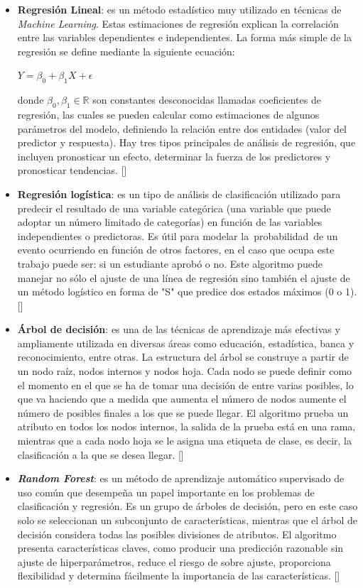 \begin{itemize}
    \item \textbf{Regresión Lineal}: es un método estadístico muy utilizado en técnicas de \textit{Machine Learning}. Estas estimaciones de regresión explican la correlación entre las variables dependientes e independientes. La forma más simple de la regresión se define mediante la siguiente ecuación:
    \begin{center}
        $Y = \beta_0 + \beta_1X + \epsilon$
    \end{center}
    donde $\beta_0, \beta_1 \in \mathbb{R}$ son constantes desconocidas llamadas coeficientes de regresión, las cuales se pueden calcular como estimaciones de algunos parámetros del modelo, definiendo la relación entre dos entidades (valor del predictor y respuesta). Hay tres tipos principales de análisis de regresión, que incluyen pronosticar un efecto, determinar la fuerza de los predictores y pronosticar tendencias. [\cite{faul2019concise}]
    \item \textbf{Regresión logística}: es un tipo de análisis de clasificación utilizado para predecir el resultado de una variable categórica (una variable que puede adoptar un número limitado de categorías) en función de las variables independientes o predictoras. Es útil para modelar la probabilidad de un evento ocurriendo en función de otros factores, en el caso que ocupa este trabajo puede ser: si un estudiante aprobó o no. Este algoritmo puede manejar no sólo el ajuste de una línea de regresión sino también el ajuste de un método logístico en forma de "S" que predice dos estados máximos (0 o 1). [\cite{wei-meng2019python}]
    \item \textbf{Árbol de decisión}: es una de las técnicas de aprendizaje más efectivas y ampliamente utilizada en diversas áreas como educación, estadística, banca y reconocimiento, entre otras. La estructura del árbol se construye a partir de un nodo raíz, nodos internos y nodos hoja. Cada nodo se puede definir como el momento en el que se ha de tomar una decisión de entre varias posibles, lo que va haciendo que a medida que aumenta el número de nodos aumente el número de posibles finales a los que se puede llegar. El algoritmo prueba un atributo en todos los nodos internos, la salida de la prueba está en una rama, mientras que a cada nodo hoja se le asigna una etiqueta de clase, es decir, la clasificación a la que se desea llegar. [\cite{faul2019concise}]
    \item \textit{\textbf{Random Forest}}: es un método de aprendizaje automático supervisado de uso común que desempeña un papel importante en los problemas de clasificación y regresión. Es un grupo de árboles de decisión, pero en este caso solo se seleccionan un subconjunto de características, mientras que el árbol de decisión considera todas las posibles divisiones de atributos. El algoritmo presenta características claves, como producir una predicción razonable sin ajuste de hiperparámetros, reduce el riesgo de sobre ajuste, proporciona flexibilidad y determina fácilmente la importancia de las características. [\cite{faul2019concise}]

\end{itemize}
